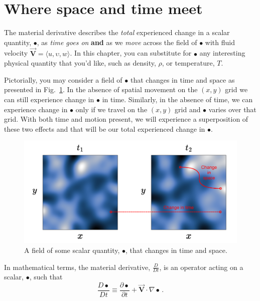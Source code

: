 \section{Where space and time meet}

The material derivative describes the \textit{total} experienced change in a scalar quantity, $\bullet$, as \textit{time goes on} \textbf{and} as we \textit{move} across the field of $\bullet$ with fluid velocity $\vec{\bm{V}} = \langle u, \upsilon, w \rangle$.
In this chapter, you can substitute for $\bullet$ any interesting physical quantity that you'd like, such as density, $\rho$, or temperature, $T$.

Pictorially, you may consider a field of $\bullet$ that changes in time and space as presented in Fig.~\ref{fig:material-derivative-example}. In the absence of spatial movement on the $(x,y)$ grid we can still experience change in $\bullet$ in time. Similarly, in the absence of time, we can experience change in $\bullet$ only if we travel on the $(x,y)$ grid and $\bullet$ varies over that grid. With both time and motion present, we will experience a superposition of these two effects and that will be our total experienced change in $\bullet$.
\begin{figure}[H]
\centering\includegraphics[width=15cm]{material-derivative.pdf}
\caption{A field of some scalar quantity, $\bullet$, that changes in time and space.}			
\label{fig:material-derivative-example}
\end{figure}

In mathematical terms, the material derivative, $\frac{D}{Dt}$, is an operator acting on a scalar, $\bullet$, such that
\begin{equation} \label{eq:material-derivative}
\frac{D \bullet}{D t} \equiv \frac{\partial \bullet}{\partial t} + \vec{\bm{V}} \cdot \nabla \bullet \, .
\end{equation}


